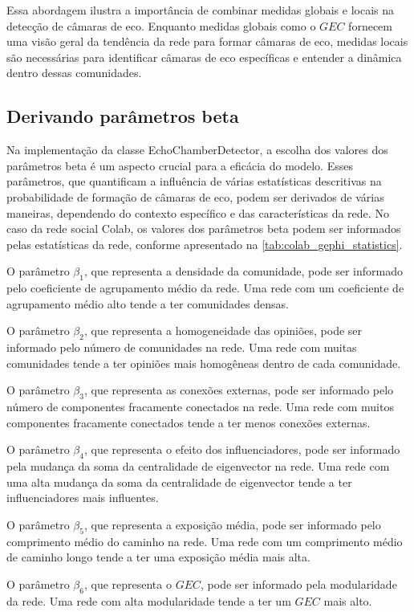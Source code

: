 Essa abordagem ilustra a importância de combinar medidas globais e locais na detecção de câmaras de eco. Enquanto medidas globais como o $GEC$ fornecem uma visão geral da tendência da rede para formar câmaras de eco, medidas locais são necessárias para identificar câmaras de eco específicas e entender a dinâmica dentro dessas comunidades.

\subsection{Derivando parâmetros beta}

Na implementação da classe EchoChamberDetector, a escolha dos valores dos parâmetros beta é um aspecto crucial para a eficácia do modelo. Esses parâmetros, que quantificam a influência de várias estatísticas descritivas na probabilidade de formação de câmaras de eco, podem ser derivados de várias maneiras, dependendo do contexto específico e das características da rede. No caso da rede social Colab, os valores dos parâmetros beta podem ser informados pelas estatísticas da rede, conforme apresentado na \autoref{tab:colab_gephi_statistics}.

O parâmetro $\beta_1$, que representa a densidade da comunidade, pode ser informado pelo coeficiente de agrupamento médio da rede. Uma rede com um coeficiente de agrupamento médio alto tende a ter comunidades densas.

O parâmetro $\beta_2$, que representa a homogeneidade das opiniões, pode ser informado pelo número de comunidades na rede. Uma rede com muitas comunidades tende a ter opiniões mais homogêneas dentro de cada comunidade.

O parâmetro $\beta_3$, que representa as conexões externas, pode ser informado pelo número de componentes fracamente conectados na rede. Uma rede com muitos componentes fracamente conectados tende a ter menos conexões externas.

O parâmetro $\beta_4$, que representa o efeito dos influenciadores, pode ser informado pela mudança da soma da centralidade de eigenvector na rede. Uma rede com uma alta mudança da soma da centralidade de eigenvector tende a ter influenciadores mais influentes.

O parâmetro $\beta_5$, que representa a exposição média, pode ser informado pelo comprimento médio do caminho na rede. Uma rede com um comprimento médio de caminho longo tende a ter uma exposição média mais alta.

O parâmetro $\beta_6$, que representa o $GEC$, pode ser informado pela modularidade da rede. Uma rede com alta modularidade tende a ter um $GEC$ mais alto.

